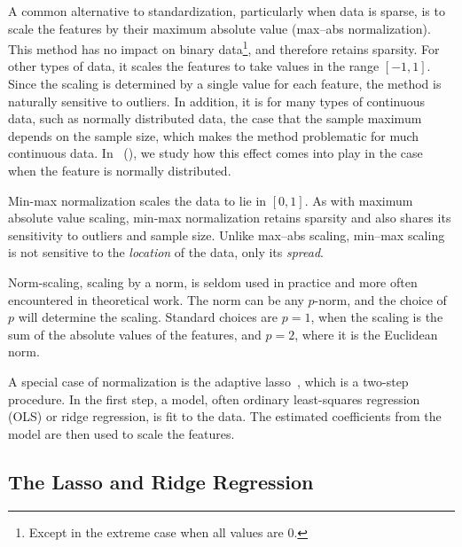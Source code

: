 A common alternative to standardization, particularly when data is sparse, is to scale the features by their maximum absolute value (max--abs normalization). This method has no impact on binary data\footnote{Except in the extreme case when all values are 0.}, and therefore retains sparsity. For other types of data, it scales the features to take values in the range \([-1, 1]\). Since the scaling is determined by a single value for each feature, the method is naturally sensitive to outliers. In addition, it is for many types of continuous data, such as normally distributed data, the case that the sample maximum depends on the sample size, which makes the method problematic for much continuous data. In ~(), we study how this effect comes into play in the case when the feature is normally distributed.

Min-max normalization scales the data to lie in \([0, 1]\). As with maximum absolute value scaling, min-max normalization retains sparsity and also shares its sensitivity to outliers and sample size. Unlike max--abs scaling, min--max scaling is not sensitive to the \emph{location} of the data, only its \emph{spread}.

Norm-scaling, scaling by a norm, is seldom used in practice and more often encountered in theoretical work. The norm can be any \(p\)-norm, and the choice of \(p\) will determine the scaling. Standard choices are \(p=1\), when the scaling is the sum of the absolute values of the features, and \(p=2\), where it is the Euclidean norm.

A special case of normalization is the adaptive lasso~\citep{zou2006}, which is a two-step procedure. In the first step, a model, often ordinary least-squares regression (OLS) or ridge regression, is fit to the data. The estimated coefficients from the model are then used to scale the features.

\subsection{The Lasso and Ridge Regression}

